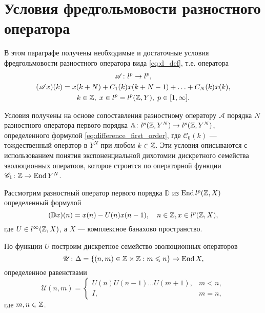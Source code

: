 \section{Условия фредгольмовости разностного оператора}\label{sec:fredhlom}
В этом параграфе получены необходимые и достаточные условия фредгольмовости разностного оператора вида \eqref{eq:d_def}, т.е. оператора
\begin{gather*}
    \mathcal A \colon l^p  \to l^p, \\
    (\mathcal A x)(k) = x(k + N) + C_1(k) x(k + N - 1) + \dotsc + C_N(k) x(k), \\
    k \in \mathbb{Z}, \; x \in l^p = l^p(\mathbb{Z}, Y), \; p \in [1, \infty].
\end{gather*}

Условия получены на основе сопоставления разностному оператору $\mathcal A$ порядка $N$ разностного оператора первого порядка $ \mathbb A\colon l^p(\mathbb{Z}, Y^N) \to l^p(\mathbb{Z}, Y^N)$, определенного формулой \eqref{eq:difference_first_order}, где $\mathcal C_0(k)$ --- тождественный оператор в $Y^N$ при любом $k \in \mathbb{Z}$. Эти условия описываются с использованием понятия экспоненциальной дихотомии дискретного семейства эволюционных оператоов, которое строится по операторной функции $\mathcal C_1\colon \mathbb{Z} \to \operatorname{End}{Y^N}$.

Рассмотрим разностный оператор первого порядка $\mathbb D$ из $\operatorname{End} l^p(\mathbb{Z}, X)$ определенный формулой
\[ (\mathbb D x)(n) = x(n) - U(n)x(n - 1), \quad n \in \mathbb{Z}, x \in l^p(\mathbb{Z}, X), \]
где $U \in l^\infty(\mathbb{Z}, X)$, а $X$ --- комплексное банахово пространство.

По функции $U$ построим дискретное семейство эволюционных операторов
\[\mathcal U \colon \Delta = \left\{(n, m) \in \mathbb{Z} \times \mathbb{Z} : m \leqslant n\right\} \to \operatorname{End} X, \]
определенное равенствами
\[
    \mathcal U (n, m) = \begin{cases}
        U(n)U(n-1)\dotsc U(m+1), & m < n, \\
        I,                       & m = n,
    \end{cases}
\]
где $m, n \in \mathbb{Z}$.

